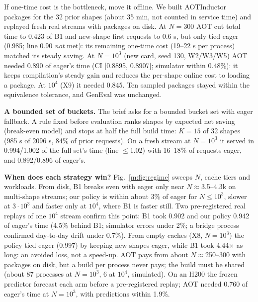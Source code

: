 \documentclass[conference]{IEEEtran}
\newcommand{\tn}[1]{#1}%
\begin{document}
If one-time cost is the bottleneck, move it offline. We built AOTInductor packages for the 32 prior shapes (about \tn{35 min}, not counted in service time) and replayed fresh real streams with packages on disk. At $N{=}300$ AOT cut total time to \tn{0.423} of B1 and new-shape first requests to \tn{0.6 s}, but only tied eager (\tn{0.985}; line 0.90 \emph{not} met): its remaining one-time cost (\tn{19--22 s} per process) matched its steady saving. At $N{=}10^3$ (new card, seed 130, W2/W3/W5) AOT needed \tn{0.890} of eager's time (CI [\tn{0.8895}, \tn{0.8907}]; simulator within \tn{0.48\%}): it keeps compilation's steady gain and reduces the per-shape online cost to loading a package. At $10^4$ (X9) it needed \tn{0.845}. Ten sampled packages stayed within the equivalence tolerance, and GenEval was unchanged.

\textbf{A bounded set of buckets.} The brief asks for a bounded bucket set with eager fallback. A rule fixed before evaluation ranks shapes by expected net saving (break-even model) and stops at half the full build time: $K{=}15$ of 32 shapes (\tn{985 s} of \tn{2096 s}, \tn{84\%} of prior requests). On a fresh stream at $N{=}10^3$ it served in \tn{0.994}/\tn{1.002} of the full set's time (line $\le$1.02) with \tn{16--18\%} of requests eager, and \tn{0.892}/\tn{0.896} of eager's.

\textbf{When does each strategy win?} Fig.~\ref{m:fig:regime} sweeps $N$, cache tiers and workloads. From disk, B1 breaks even with eager only near $N{\approx}$\tn{3.5--4.3k} on multi-shape streams; our policy is within about 3\% of eager for $N{\le}10^3$, slower at $3{\cdot}10^3$ and faster only at $10^4$, where B1 is faster still. Two pre-registered real replays of one $10^4$ stream confirm this point: B1 took \tn{0.902} and our policy \tn{0.942} of eager's time (\tn{4.5\%} behind B1; simulator errors under \tn{2\%}; a bridge process confirmed day-to-day drift under \tn{0.7\%}). From empty caches (X8, $N{=}10^3$) the policy tied eager (\tn{0.997}) by keeping new shapes eager, while B1 took \tn{4.44}$\times$ as long: an avoided loss, not a speed-up. AOT pays from about $N{\approx}$\tn{250--300} with packages on disk, but a build per process never pays; the build must be shared (about \tn{87} processes at $N{=}10^3$, \tn{6} at $10^4$, simulated). On an H200 the frozen predictor forecast each arm before a pre-registered replay; AOT needed \tn{0.760} of eager's time at $N{=}10^3$, with predictions within \tn{1.9\%}.
\end{document}
